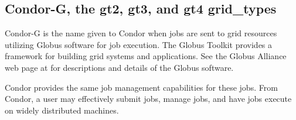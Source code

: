 
\subsection{\label{sec:Condor-G}Condor-G, the gt2, gt3, and gt4 grid\_types}

Condor-G is the name given to Condor when 
 jobs are sent to grid resources utilizing
Globus software for job execution.
The Globus Toolkit provides a framework for building grid systems
and applications.
See the Globus Alliance web page at
for descriptions and details of the Globus software.

Condor provides the same job management capabilities for these
jobs.
From Condor, a user may effectively submit jobs, manage jobs,
and have jobs execute on widely distributed machines.



